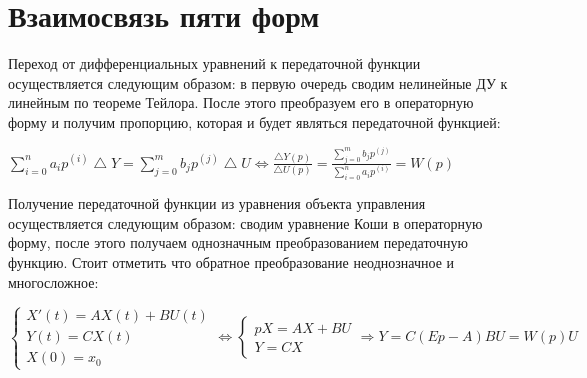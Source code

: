 \documentclass[14pt,a4paper,report]{report}
\begin{document}
\section{Взаимосвязь пяти форм}

Переход от дифференциальных уравнений к передаточной функции осуществляется следующим образом: в первую очередь сводим нелинейные ДУ к линейным по теореме Тейлора. После этого преобразуем его в операторную форму и получим пропорцию, которая и будет являться передаточной функцией: 

$ \sum_{i=0}^{n}a_{i}p^{(i)}\bigtriangleup Y = \sum_{j=0}^{m}b_{j}p^{(j)}\bigtriangleup U \Longleftrightarrow \frac{\bigtriangleup Y(p)}{\bigtriangleup U(p)}=\frac{\sum_{j=0}^{m}b_{j}p^{(j)}}{\sum_{i=0}^{n}a_{i}p^{(i)}} = W(p) $ 

Получение передаточной функции из уравнения объекта управления осуществляется следующим образом: сводим уравнение Коши в операторную форму, после этого получаем однозначным преобразованием передаточную функцию. Стоит отметить что обратное преобразование неоднозначное и многосложное:


\begin{equation*}
	\begin{cases}
		\text{$X'(t)=A X(t) + B U(t)$} \\
		\text{$Y(t)=C X(t)$} \\
		\text{$X(0)=x_{0}$}
	\end{cases}
	\Longleftrightarrow 
	\begin{cases}
		\text{$p X=A X + B U$} \\
		\text{$Y=C X$}
	\end{cases}
	\Longrightarrow
	\text{$Y=C (E p-A) B U=W(p) U$}
\end{equation*}
\end{document}
